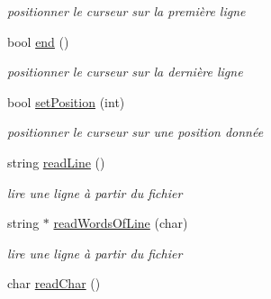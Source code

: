 \begin{DoxyCompactItemize}
\begin{DoxyCompactList}\small\item\em positionner le curseur sur la première ligne \end{DoxyCompactList}\item 
bool \hyperlink{class_manage_file_abecdb462684f3fa27d51a8a6a1916583}{end} ()\hypertarget{class_manage_file_abecdb462684f3fa27d51a8a6a1916583}{}\label{class_manage_file_abecdb462684f3fa27d51a8a6a1916583}

\begin{DoxyCompactList}\small\item\em positionner le curseur sur la dernière ligne \end{DoxyCompactList}\item 
bool \hyperlink{class_manage_file_a8fc25ce213e0cdfd7cb1c317a1bc9f9e}{set\+Position} (int)\hypertarget{class_manage_file_a8fc25ce213e0cdfd7cb1c317a1bc9f9e}{}\label{class_manage_file_a8fc25ce213e0cdfd7cb1c317a1bc9f9e}

\begin{DoxyCompactList}\small\item\em positionner le curseur sur une position donnée \end{DoxyCompactList}\item 
string \hyperlink{class_manage_file_acbb4cb80a8095b07eef0ac1e7158609e}{read\+Line} ()\hypertarget{class_manage_file_acbb4cb80a8095b07eef0ac1e7158609e}{}\label{class_manage_file_acbb4cb80a8095b07eef0ac1e7158609e}

\begin{DoxyCompactList}\small\item\em lire une ligne à partir du fichier \end{DoxyCompactList}\item 
string $\ast$ \hyperlink{class_manage_file_a6a381faaf02f1ae91977ac96559ade86}{read\+Words\+Of\+Line} (char)\hypertarget{class_manage_file_a6a381faaf02f1ae91977ac96559ade86}{}\label{class_manage_file_a6a381faaf02f1ae91977ac96559ade86}

\begin{DoxyCompactList}\small\item\em lire une ligne à partir du fichier \end{DoxyCompactList}\item 
char \hyperlink{class_manage_file_a1e108ebc91f037f6626b930a8bb4b48a}{read\+Char} ()\hypertarget{class_manage_file_a1e108ebc91f037f6626b930a8bb4b48a}{}\label{class_manage_file_a1e108ebc91f037f6626b930a8bb4b48a}


\end{DoxyCompactItemize}
